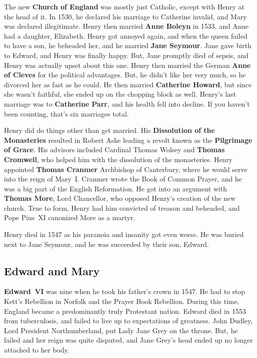 The new \textbf{Church of England} was mostly just Catholic, except with Henry at the head of it.
In 1530, he declared his marriage to Catherine invalid, and Mary was declared illegitimate.
Henry then married \textbf{Anne Boleyn} in 1533, and Anne had a daughter, Elizabeth.
Henry got annoyed again, and when the queen failed to have a son, he beheaded her, and he married \textbf{Jane Seymour}.
Jane gave birth to Edward, and Henry was finally happy.
But, Jane promptly died of sepsis, and Henry was actually upset about this one.
Henry then married the German \textbf{Anne of Cleves} for the political advantages.
But, he didn't like her very much, so he divorced her as fast as he could.
He then married \textbf{Catherine Howard}, but since she wasn't faithful,
she ended up on the chopping block as well.
Henry's last marriage was to \textbf{Catherine Parr}, and his health fell into decline.
If you haven't been counting, that's six marriages total.

Henry did do things other than get married.
His \textbf{Dissolution of the Monasteries} resulted in
Robert Aske leading a revolt known as the \textbf{Pilgrimage of Grace}.
His advisors included Cardinal Thomas Wolsey and \textbf{Thomas Cromwell},
who helped him with the dissolution of the monasteries.
Henry appointed \textbf{Thomas Cranmer} Archbishop of Canterbury,
where he would serve into the reign of Mary~I.
Cranmer wrote the Book of Common Prayer, and he was a big part of the English Reformation.
He got into an argument with \textbf{Thomas More}, Lord Chancellor, who opposed Henry's creation of the new church.
True to form, Henry had him convicted of treason and beheaded, and Pope Pius~XI canonized More as a martyr.

Henry died in 1547 as his paranoia and insanity got even worse.
He was buried next to Jane Seymour, and he was succeeded by their son, Edward.

\subsection*{Edward and Mary}

\textbf{Edward~VI} was nine when he took his father's crown in 1547.
He had to stop Kett's Rebellion in Norfolk and the Prayer Book Rebellion.
During this time, England became a predominantly truly Protestant nation.
Edward died in 1553 from tuberculosis, and failed to live up to expectations of greatness.
John Dudley, Lord President Northumberland, put Lady Jane Grey on the throne.
But, he failed and her reign was quite disputed,
and Jane Grey's head ended up no longer attached to her body.

